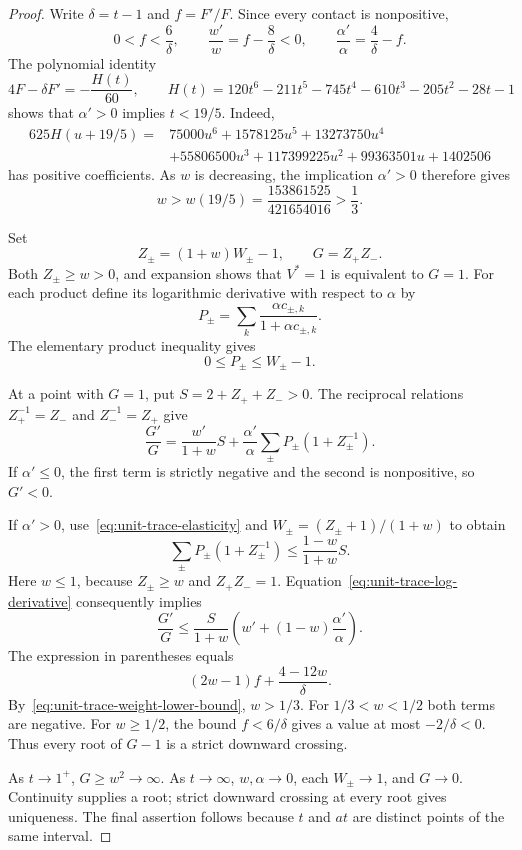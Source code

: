 \documentclass[11pt,a4paper]{article}
\begin{document}
\begin{proof}
Write $\delta=t-1$ and $f=F'/F$. Since every contact is
nonpositive,
\[
                 0<f<\frac6\delta,\qquad
 \frac{w'}w=f-\frac8\delta<0,\qquad
 \frac{\alpha'}\alpha=\frac4\delta-f.
\]
The polynomial identity
\[
 4F-\delta F'=-\frac{H(t)}{60},\qquad
 H(t)=120t^6-211t^5-745t^4-610t^3-205t^2-28t-1
\]
shows that $\alpha'>0$ implies $t<19/5$. Indeed,
\begin{align*}
 625H(u+19/5)={}&75000u^6+1578125u^5+13273750u^4\\
 &+55806500u^3+117399225u^2+99363501u+1402506
\end{align*}
has positive coefficients. As $w$ is decreasing, the implication
$\alpha'>0$ therefore gives
\begin{equation}\label{eq:unit-trace-weight-lower-bound}
             w>w(19/5)=\frac{153861525}{421654016}>\frac13.
\end{equation}

Set
\[
 Z_\pm=(1+w)W_\pm-1,\qquad G=Z_+Z_-.
\]
Both $Z_\pm\ge w>0$, and expansion shows that $V^*=1$ is
equivalent to $G=1$. For each product define its logarithmic
derivative with respect to $\alpha$ by
\[
 P_\pm=\sum_k\frac{\alpha c_{\pm,k}}{1+\alpha c_{\pm,k}}.
\]
The elementary product inequality gives
\begin{equation}\label{eq:unit-trace-elasticity}
                         0\le P_\pm\le W_\pm-1.
\end{equation}

At a point with $G=1$, put $S=2+Z_++Z_->0$. The reciprocal
relations $Z_+^{-1}=Z_-$ and $Z_-^{-1}=Z_+$ give
\begin{equation}\label{eq:unit-trace-log-derivative}
 \frac{G'}G=\frac{w'}{1+w}S+
 \frac{\alpha'}\alpha
              \sum_\pm P_\pm(1+Z_\pm^{-1}).
\end{equation}
If $\alpha'\le0$, the first term is strictly negative and the
second is nonpositive, so $G'<0$.

If $\alpha'>0$, use~\eqref{eq:unit-trace-elasticity} and
$W_\pm=(Z_\pm+1)/(1+w)$ to obtain
\[
 \sum_\pm P_\pm(1+Z_\pm^{-1})
 \le \frac{1-w}{1+w}S.
\]
Here $w\le1$, because $Z_\pm\ge w$ and $Z_+Z_-=1$.
Equation~\eqref{eq:unit-trace-log-derivative} consequently implies
\[
 \frac{G'}G\le\frac{S}{1+w}
       \left(w'+(1-w)\frac{\alpha'}\alpha\right).
\]
The expression in parentheses equals
\[
                 (2w-1)f+\frac{4-12w}{\delta}.
\]
By~\eqref{eq:unit-trace-weight-lower-bound}, $w>1/3$.
For $1/3<w<1/2$ both terms are negative. For $w\ge1/2$,
the bound $f<6/\delta$ gives a value at most $-2/\delta<0$.
Thus every root of $G-1$ is a strict downward crossing.

As $t\to1^+$, $G\ge w^2\to\infty$. As $t\to\infty$,
$w,\alpha\to0$, each $W_\pm\to1$, and $G\to0$.
Continuity supplies a root; strict downward crossing at every
root gives uniqueness. The final assertion follows because $t$
and $at$ are distinct points of the same interval.
\end{proof}
\end{document}
